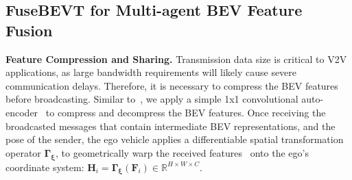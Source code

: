 \documentclass{article}
\def\im_shift{0.01\textwidth}
\begin{document}

\subsection{FuseBEVT for Multi-agent BEV Feature Fusion}
\label{ssec:fusebevt}
\noindent\textbf{Feature Compression and Sharing.}
Transmission data size is critical to V2V applications, as large bandwidth requirements will likely cause severe communication delays.
%
Therefore, it is necessary to compress the BEV features before broadcasting.
%
Similar to~\cite{xu2022v2x, li2021learning}, we apply a simple 1x1 convolutional auto-encoder~\cite{masci2011stacked} to compress and decompress the BEV features.
%
Once receiving the broadcasted messages that contain intermediate BEV representations, and the pose of the sender, the ego vehicle applies a differentiable spatial transformation operator $\mathbf{\Gamma_{\xi}}$, to geometrically warp the received features~\cite{jaderberg2015spatial} onto the ego's coordinate system: $\mathbf{H}_i=\mathbf{\Gamma_{\xi}}\left(\mathbf{F}_i\right)\in \mathbb{R}^{H \times W \times C}$.
\end{document}
